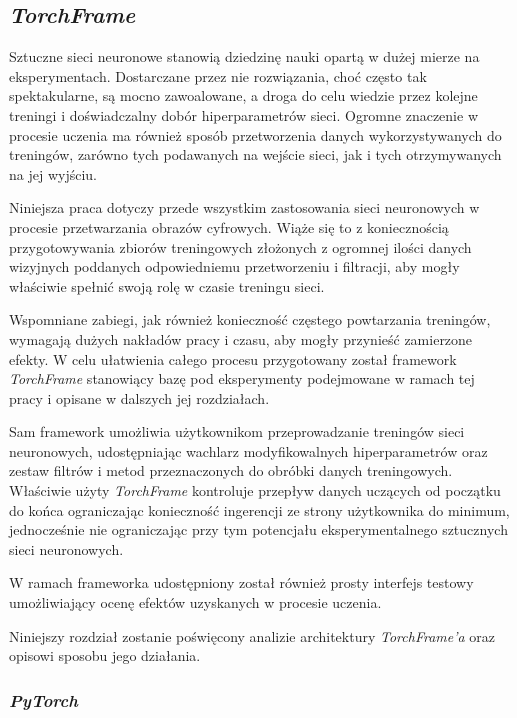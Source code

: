 \subsection[\textit{TorchFrame} (Piotr Winkler)]{\textit{TorchFrame}}
\label{TorchFrame}

  Sztuczne sieci neuronowe stanowią dziedzinę nauki opartą w dużej mierze na
  eksperymentach. Dostarczane przez nie rozwiązania, choć często tak spektakularne,
  są mocno zawoalowane, a droga do celu wiedzie przez kolejne treningi
  i doświadczalny dobór hiperparametrów sieci. Ogromne znaczenie w procesie uczenia
  ma również sposób przetworzenia danych wykorzystywanych do treningów, zarówno
  tych podawanych na wejście sieci, jak i tych otrzymywanych na jej wyjściu.

  Niniejsza praca dotyczy przede wszystkim zastosowania sieci neuronowych w
  procesie przetwarzania obrazów cyfrowych. Wiąże się to z koniecznością przygotowywania
  zbiorów treningowych złożonych z ogromnej ilości danych wizyjnych poddanych
  odpowiedniemu przetworzeniu i filtracji, aby mogły właściwie spełnić swoją rolę
  w czasie treningu sieci.

  Wspomniane zabiegi, jak również konieczność częstego powtarzania treningów,
  wymagają dużych nakładów pracy i czasu, aby mogły przynieść zamierzone efekty.
  W celu ułatwienia całego procesu przygotowany został framework \textit{TorchFrame}
  stanowiący bazę pod eksperymenty podejmowane w ramach tej pracy i opisane w
  dalszych jej rozdziałach.

  Sam framework umożliwia użytkownikom przeprowadzanie treningów sieci neuronowych,
  udostępniając wachlarz modyfikowalnych hiperparametrów oraz zestaw filtrów i metod
  przeznaczonych do obróbki danych treningowych. Właściwie użyty \textit{TorchFrame} kontroluje
  przepływ danych uczących od początku do końca ograniczając konieczność ingerencji ze
  strony użytkownika do minimum, jednocześnie nie ograniczając przy tym potencjału
  eksperymentalnego sztucznych sieci neuronowych.

  W ramach frameworka udostępniony został również prosty interfejs testowy
  umożliwiający ocenę efektów uzyskanych w procesie uczenia.

  Niniejszy rozdział zostanie poświęcony analizie architektury \textit{TorchFrame'a} oraz
  opisowi sposobu jego działania.

  \subsubsection{\textit{PyTorch}}

